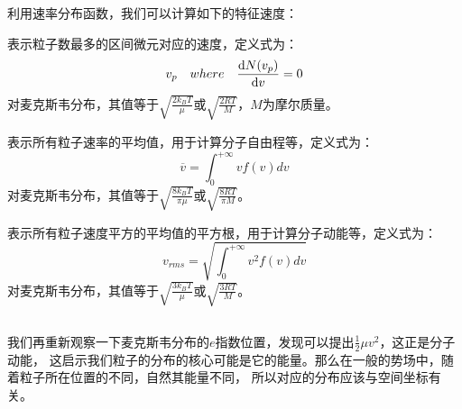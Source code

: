             利用速率分布函数，我们可以计算如下的特征速度：
            \begin{Itemize}
                \item {}表示粒子数最多的区间微元对应的速度，定义式为：
                \begin{equation}
                    v_{p} \quad where \quad \frac{\mathrm{d} N({v_{p}})}{\mathrm{d}{v}} = 0
                    \nonumber
                \end{equation}
                对麦克斯韦分布，其值等于$\sqrt{\frac{2k_{B}T}{\mu}}$或$\sqrt{\frac{2RT}{M}}$，$M$为摩尔质量。
                \item {}表示所有粒子速率的平均值，用于计算分子自由程等，定义式为：
                \begin{equation}
                    \overline{v} = \int_{0}^{+\infty} vf(v)dv
                    \nonumber
                \end{equation}
                对麦克斯韦分布，其值等于$\sqrt{\frac{8k_{B}T}{\pi \mu}}$或$\sqrt{\frac{8RT}{\pi M}}$。
                \item {}表示所有粒子速度平方的平均值的平方根，用于计算分子动能等，定义式为：
                \begin{equation}
                    v_{rms} = \sqrt{\int_{0}^{+\infty} v^{2}f(v)dv}
                    \nonumber
                \end{equation}
                对麦克斯韦分布，其值等于$\sqrt{\frac{3k_{B}T}{\mu}}$或$\sqrt{\frac{3RT}{M}}$。
            \end{Itemize}
        \subsection[玻尔兹曼分布]{}
            我们再重新观察一下麦克斯韦分布的$e$指数位置，发现可以提出$\frac{1}{2}\mu v^{2}$，这正是分子动能，
            这启示我们粒子的分布的核心可能是它的能量。那么在一般的势场中，随着粒子所在位置的不同，自然其能量不同，
            所以对应的分布应该与空间坐标有关。

